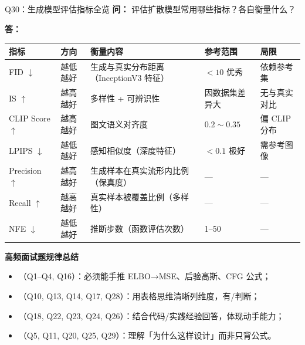 \begin{conceptbox}{Q30：生成模型评估指标全览}
\textbf{问：} 评估扩散模型常用哪些指标？各自衡量什么？

\textbf{答：}
\begin{center}
\begin{tabular}{lllll}
\hline
\textbf{指标} & \textbf{方向} & \textbf{衡量内容} & \textbf{参考范围} & \textbf{局限} \\ \hline
FID $\downarrow$ & 越低越好 & 生成与真实分布距离（InceptionV3 特征）& $<10$ 优秀 & 依赖参考集 \\
IS $\uparrow$ & 越高越好 & 多样性 + 可辨识性 & 因数据集差异大 & 无与真实对比 \\
CLIP Score $\uparrow$ & 越高越好 & 图文语义对齐度 & $0.2\sim0.35$ & 偏 CLIP 分布 \\
LPIPS $\downarrow$ & 越低越好 & 感知相似度（深度特征）& $<0.1$ 极好 & 需参考图像 \\
Precision $\uparrow$ & 越高越好 & 生成样本在真实流形内比例（保真度）& — & — \\
Recall $\uparrow$ & 越高越好 & 真实样本被覆盖比例（多样性）& — & — \\
NFE $\downarrow$ & 越低越好 & 推断步数（函数评估次数）& 1--50 & — \\
\hline
\end{tabular}
\end{center}
\end{conceptbox}

\begin{summarybox}
\textbf{高频面试题规律总结}
\begin{itemize}
  \item {}（Q1--Q4, Q16）：必须能手推 ELBO→MSE、后验高斯、CFG 公式；
  \item {}（Q10, Q13, Q14, Q17, Q28）：用表格思维清晰列维度，有/判断；
  \item {}（Q18, Q22, Q23, Q24, Q26）：结合代码/实践经验回答，体现动手能力；
  \item {}（Q5, Q11, Q20, Q25, Q29）：理解「为什么这样设计」而非只背公式。
\end{itemize}
\end{summarybox}
